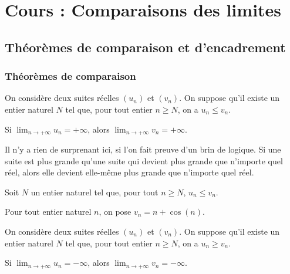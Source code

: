 \documentclass[11pt,fleqn, openany]{book} %
\begin{document}

\chapter{Cours : Comparaisons des limites}

\section{Théorèmes de comparaison et d'encadrement}

\subsection{Théorèmes de comparaison}

\begin{theorem}On considère deux suites réelles $(u_n)$ et $(v_n)$. On suppose qu'il existe un entier naturel $N$ tel que, pour tout entier $n \geqslant N$, on a $u_n \leqslant v_n$. 

Si  $\displaystyle \lim_{n \to +\infty} u_n = +\infty$, alors  $\displaystyle \lim_{n \to +\infty} v_n = +\infty $.\end{theorem}

Il n'y a rien de surprenant ici, si l'on fait preuve d'un brin de logique. Si une suite est plus grande qu'une suite qui devient plus grande que n'importe quel réel, alors elle devient elle-même plus grande que n'importe quel réel.

\begin{demonstration} Soit $N$ un entier naturel tel que, pour tout $n\geqslant N$, $u_n \leqslant v_n$.

\vskip50pt

\end{demonstration}

\begin{example} Pour tout entier naturel $n$, on pose $v_n=n+\cos (n)$.

\vskip30pt
\end{example}


\begin{theorem}On considère deux suites réelles $(u_n)$ et $(v_n)$. On suppose qu'il existe un entier naturel $N$ tel que, pour tout entier $n \geqslant N$, on a $u_n \geqslant v_n$. 

Si  $\displaystyle \lim_{n \to +\infty} u_n = -\infty$, alors  $\displaystyle \lim_{n \to +\infty} v_n = -\infty $.\end{theorem}
\end{document}
